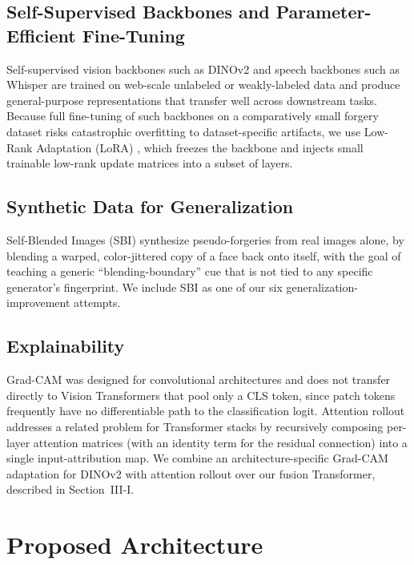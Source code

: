 \documentclass[conference]{IEEEtran}
\begin{document}
\subsection{Self-Supervised Backbones and Parameter-Efficient Fine-Tuning}
Self-supervised vision backbones such as DINOv2 \cite{oquab2023dinov2} and
speech backbones such as Whisper \cite{radford2023whisper} are trained on
web-scale unlabeled or weakly-labeled data and produce general-purpose
representations that transfer well across downstream tasks. Because full
fine-tuning of such backbones on a comparatively small forgery dataset risks
catastrophic overfitting to dataset-specific artifacts, we use Low-Rank
Adaptation (LoRA) \cite{hu2022lora}, which freezes the backbone and injects
small trainable low-rank update matrices into a subset of layers.

\subsection{Synthetic Data for Generalization}
Self-Blended Images (SBI) \cite{shiohara2022sbi} synthesize pseudo-forgeries
from real images alone, by blending a warped, color-jittered copy of a face
back onto itself, with the goal of teaching a generic
``blending-boundary'' cue that is not tied to any specific generator's
fingerprint. We include SBI as one of our six generalization-improvement
attempts.

\subsection{Explainability}
Grad-CAM \cite{selvaraju2017gradcam} was designed for convolutional
architectures and does not transfer directly to Vision Transformers that
pool only a CLS token, since patch tokens frequently have no differentiable
path to the classification logit. Attention rollout \cite{abnar2020rollout}
addresses a related problem for Transformer stacks by recursively composing
per-layer attention matrices (with an identity term for the residual
connection) into a single input-attribution map. We combine an
architecture-specific Grad-CAM adaptation for DINOv2 with attention rollout
over our fusion Transformer, described in Section~III-I.

\section{Proposed Architecture}
\end{document}
